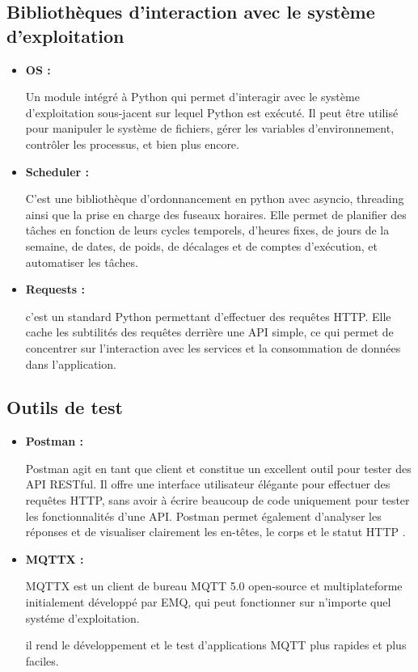 \subsection{Bibliothèques d'interaction avec le système d'exploitation}
\begin{itemize}
    \item\textbf{OS : }
        \par Un module intégré à Python qui permet d'interagir avec le système d'exploitation sous-jacent sur lequel Python est exécuté. 
        Il peut être utilisé pour manipuler le système de fichiers, gérer les variables d'environnement, contrôler les processus, et bien plus encore\cite{os}.

    \item \textbf{Scheduler : }
        \par C'est une bibliothèque d'ordonnancement en python avec asyncio, threading ainsi que la prise en charge des fuseaux horaires.
         Elle permet de planifier des tâches en fonction de leurs cycles temporels, d'heures fixes, de jours de la semaine,
         de dates, de poids, de décalages et de comptes d'exécution, et automatiser les tâches\cite{scheduler}.
    \item \textbf{Requests : }
        \par c'est un standard Python permettant d'effectuer des requêtes HTTP.
         Elle cache les subtilités des requêtes derrière une API simple, ce qui permet de concentrer sur l'interaction avec les services et la consommation de données dans l'application\cite{requests}.
    
\end{itemize}
\subsection{Outils de test}
\begin{itemize}
    \item \textbf{Postman : }
                \par  Postman agit en tant que client et constitue un excellent outil pour tester des API RESTful. Il offre une interface utilisateur élégante pour effectuer des requêtes HTTP,
                 sans avoir à écrire beaucoup de code uniquement pour tester les fonctionnalités d'une API. 
                 Postman permet également d'analyser les réponses et de visualiser clairement les en-têtes, le corps et le statut HTTP \cite{postman}. 
    \item\textbf{MQTTX :}
            \par MQTTX est un client de bureau MQTT 5.0 open-source et multiplateforme initialement développé par EMQ, qui peut fonctionner sur n'importe quel systéme d'exploitation.
            \par il rend le développement et le test d'applications MQTT plus rapides et plus faciles\cite{mqttx}.
    \end{itemize}
